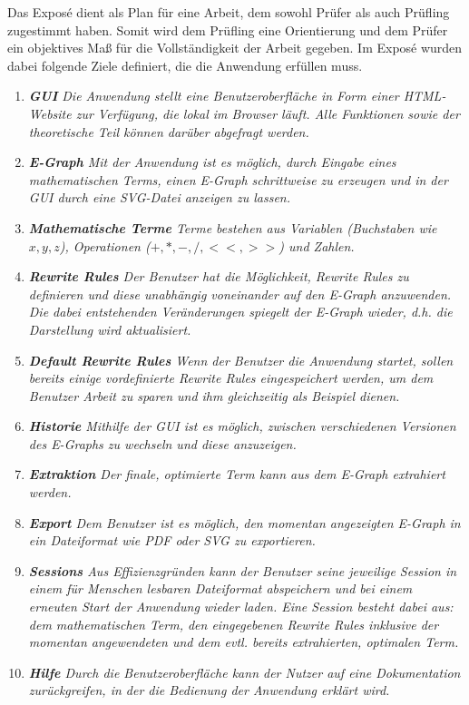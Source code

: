 Das Exposé dient als Plan für eine Arbeit, dem sowohl Prüfer als auch Prüfling zugestimmt haben. Somit wird dem Prüfling eine Orientierung
und dem Prüfer ein objektives Maß für die Vollständigkeit der Arbeit gegeben. Im Exposé wurden dabei folgende Ziele definiert, die die Anwendung
erfüllen muss.

\begin{tcolorbox}[enhanced, frame hidden, borderline west = {1.5pt}{0pt}{gray-700},lower separated=false,fontupper=\sffamily]
\begin{enumerate}[topsep=0pt,itemsep=-0.5ex,partopsep=1ex,parsep=1ex]
    \item {\sffamily\itshape \textbf{GUI} Die Anwendung stellt eine Benutzeroberfläche in Form einer HTML-Website zur Verfügung, die lokal im Browser läuft.
        Alle Funktionen sowie der theoretische Teil können darüber abgefragt werden.}
    \item {\sffamily\itshape \textbf{E-Graph} Mit der Anwendung ist es möglich, durch Eingabe eines mathematischen Terms, einen E-Graph schrittweise zu erzeugen und in der GUI durch eine SVG-Datei anzeigen zu lassen.}
    \item {\sffamily\itshape \textbf{Mathematische Terme} Terme bestehen aus Variablen (Buchstaben wie $x, y, z$), Operationen ($+, *, -, /, <<, >>$) und Zahlen.}
    \item {\sffamily\itshape \textbf{Rewrite Rules} Der Benutzer hat die Möglichkeit, Rewrite Rules zu definieren und diese unabhängig voneinander auf den E-Graph anzuwenden. Die dabei entstehenden
        Veränderungen spiegelt der E-Graph wieder, d.h. die Darstellung wird aktualisiert.}
    \item {\sffamily\itshape \textbf{Default Rewrite Rules} Wenn der Benutzer die Anwendung startet, sollen bereits einige vordefinierte Rewrite Rules eingespeichert werden, um dem Benutzer Arbeit zu sparen und
        ihm gleichzeitig als Beispiel dienen.}
    \item {\sffamily\itshape \textbf{Historie} Mithilfe der GUI ist es möglich, zwischen verschiedenen Versionen des E-Graphs zu wechseln und diese anzuzeigen.}
    \item {\sffamily\itshape \textbf{Extraktion} Der finale, optimierte Term kann aus dem E-Graph extrahiert werden.}
    \item {\sffamily\itshape \textbf{Export} Dem Benutzer ist es möglich, den momentan angezeigten E-Graph in ein Dateiformat wie PDF oder SVG zu exportieren.}
    \item {\sffamily\itshape \textbf{Sessions} Aus Effizienzgründen kann der Benutzer seine jeweilige Session in einem für Menschen lesbaren Dateiformat abspeichern und bei einem erneuten Start der Anwendung wieder
        laden. Eine Session besteht dabei aus: dem mathematischen Term, den eingegebenen Rewrite Rules inklusive der momentan angewendeten und dem evtl. bereits extrahierten, optimalen Term.}
    \item{\sffamily\itshape \textbf{Hilfe} Durch die Benutzeroberfläche kann der Nutzer auf eine Dokumentation zurückgreifen, in der die Bedienung der Anwendung erklärt wird.}
\end{enumerate}\vspace{-2mm}
    

\end{tcolorbox}
